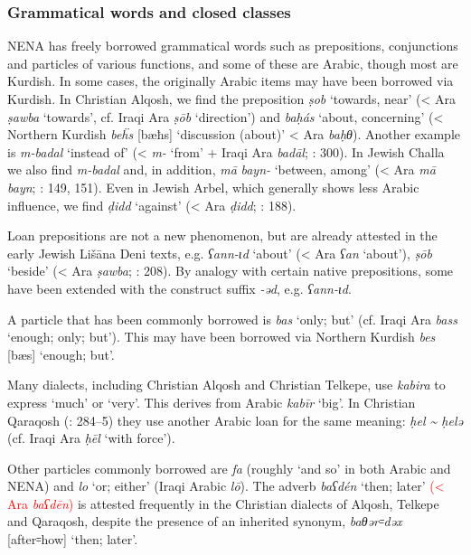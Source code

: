 \documentclass[output=paper]{langsci/langscibook}
\begin{document}
\subsubsection{Grammatical words and closed classes}\label{closedclass}

NENA has freely borrowed grammatical words such as prepositions, conjunctions and particles of various functions, and some of these are Arabic, though most are Kurdish. In some cases, the originally Arabic items may have been borrowed via Kurdish. In Christian Alqosh, we find the preposition \textit{ṣob} ‘towards, near’ (< Ara \textit{ṣawba} ‘towards’, cf. Iraqi Ara \textit{ṣōb} ‘direction’) and \textit{baḥás} ‘about, concerning’ (< Northern Kurdish \textit{be\"{h}s} [bæħs] ‘discussion (about)’ < Ara \textit{baḥθ}). Another example is \textit{m-badal} ‘instead of’ (< \textit{m-} ‘from’ + Iraqi Ara \textit{badāl}; \citealt{Coghill2004}: 300). In Jewish Challa we also find \textit{m-badal} and, in addition, \textit{mā} \textit{bayn-} ‘between, among’ (< Ara \textit{mā} \textit{bayn}; \citealt{Fassberg2010}: 149, 151). Even in Jewish Arbel, which generally shows less Arabic influence, we find \textit{ḍidd} ‘against’ (< Ara \textit{ḍidd}; \citealt{Khan1999}: 188).

Loan prepositions are not a new phenomenon, but are already attested in the early Jewish Lišāna Deni texts, e.g. \textit{ʕann\nobreakdash-ɩd} ‘about’ (< Ara \textit{ʕan} ‘about’), \textit{ṣōb} ‘beside’ (< Ara \textit{ṣawba}; \citealt{Sabar1984}: 208). By analogy with certain native prepositions, some have been extended with the construct suffix \textit{\nobreakdash-əd}, e.g. \textit{ʕann\nobreakdash-ɩd}.

A particle that has been commonly borrowed is \textit{bas} ‘only; but’ (cf. Iraqi Ara \textit{bass} ‘enough; only; but’). This may have been borrowed via Northern Kurdish \textit{bes} [bæs] ‘enough; but’.

Many dialects, including Christian Alqosh and Christian Telkepe, use \textit{kabira} to express ‘much’ or ‘very’. This derives from Arabic \textit{kabīr} ‘big’. In Christian Qaraqosh (\citealt{Khan2002}: 284–5) they use another Arabic loan for the same meaning: \textit{ḥel {\textasciitilde} ḥelə} (cf. Iraqi Ara \textit{ḥēl} ‘with force’).

Other particles commonly borrowed are \textit{fa} (roughly ‘and so’ in both Arabic and NENA) and \textit{lo} ‘or; either’ (Iraqi Arabic \textit{lō}). The adverb \textit{baʕdén} ‘then; later’ \textcolor{red}{(< Ara \textit{baʕdēn})} is attested frequently in the Christian dialects of Alqosh, Telkepe and Qaraqosh, despite the presence of an inherited synonym, \textit{baθər꞊dəx} [after꞊how] ‘then; later’.
\end{document}
